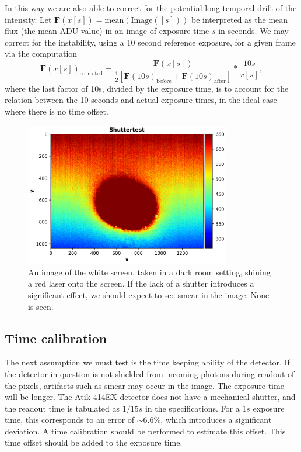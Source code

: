 \documentclass[../main.tex]{subfiles}
\begin{document}
		In this way we are also able to correct for the potential long temporal drift of the intensity. Let $\bm F(x[s]) = \text{mean}\left(\text{Image}([s])\right)$ be interpreted as the mean flux (the mean ADU value) in an image of exposure time $s$ in seconds. We may correct for the instability, using a 10 second reference exposure, for a given frame via the computation
		\begin{equation}\label{eq:fluxcorrect_notimecal}
			\bm F(x [s])_\text{corrected} = \frac{\bm F(x [s])}{\frac12\left[\bm F(10s)_\text{before}+\bm F(10s)_\text{after}\right]} * \frac{10s}{x[s]},
		\end{equation}
		where the last factor of 10s, divided by the exposure time, is to account for the relation between the 10 seconds and actual exposure times, in the ideal case where there is no time offset.
	\begin{figure}[h!]
	\centering			
	\includegraphics[width=0.8\textwidth]{shutter_test.png}
	\caption{An image of the white screen, taken in a dark room setting, shining a red laser onto the screen. If the lack of a shutter introduces a significant effect, we should expect to see smear in the image. None is seen. }
	\label{fig:shuttertest}
	\end{figure}
	\subsection{Time calibration}\label{sec:timecal}
	The next assumption we must test is the time keeping ability of the detector.
	If the detector in question is not shielded from incoming photons during readout of the pixels, artifacts such as smear may occur in the image. The exposure time will be longer. The Atik 414EX detector does not have a mechanical shutter, and the readout time is tabulated as $1/15s$ in the specifications. For a $1s$ exposure time, this corresponds to an error of $\sim 6.6\%$, which introduces a significant deviation. A time calibration should be performed to estimate this offset. This time offset should be added to the exposure time. 
	
\end{document}
